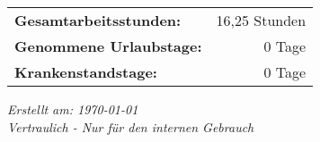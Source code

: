 \documentclass[11pt]{article}
\begin{document}
\vspace{0.5cm}
\begin{tabularx}{\textwidth}{Xr}
    \textbf{Gesamtarbeitsstunden:} & 16,25 Stunden \\
    \textbf{Genommene Urlaubstage:} & 0 Tage \\
    \textbf{Krankenstandstage:} & 0 Tage \\[0.5cm]
\end{tabularx}
\begin{flushleft}
    \small
    \textit{Erstellt am: \today} \\
    \textit{Vertraulich - Nur für den internen Gebrauch}
\end{flushleft}
\end{document}
